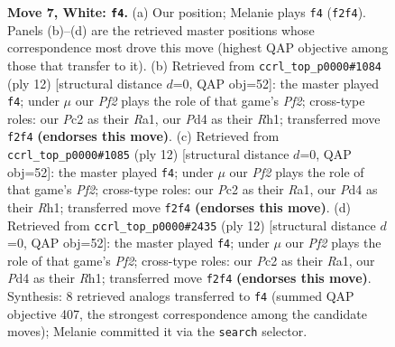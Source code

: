 \documentclass[11pt]{article}
\begin{document}
\begin{figure}[p]
\caption{\textbf{Move 7, White: \texttt{f4}.} (a) Our position; Melanie plays \texttt{f4} (\texttt{f2f4}). Panels (b)--(d) are the retrieved master positions whose correspondence most drove this move (highest QAP objective among those that transfer to it). (b) Retrieved from \texttt{ccrl\_top\_p0000\#1084} (ply 12) [structural distance $d$=0, QAP obj=52]: the master played \texttt{f4}; under $\mu$ our \emph{Pf2} plays the role of that game's \emph{Pf2}; cross-type roles: our \emph{P}c2 as their \emph{R}a1, our \emph{P}d4 as their \emph{R}h1; transferred move \texttt{f2f4} \textbf{(endorses this move)}. (c) Retrieved from \texttt{ccrl\_top\_p0000\#1085} (ply 12) [structural distance $d$=0, QAP obj=52]: the master played \texttt{f4}; under $\mu$ our \emph{Pf2} plays the role of that game's \emph{Pf2}; cross-type roles: our \emph{P}c2 as their \emph{R}a1, our \emph{P}d4 as their \emph{R}h1; transferred move \texttt{f2f4} \textbf{(endorses this move)}. (d) Retrieved from \texttt{ccrl\_top\_p0000\#2435} (ply 12) [structural distance $d$=0, QAP obj=52]: the master played \texttt{f4}; under $\mu$ our \emph{Pf2} plays the role of that game's \emph{Pf2}; cross-type roles: our \emph{P}c2 as their \emph{R}a1, our \emph{P}d4 as their \emph{R}h1; transferred move \texttt{f2f4} \textbf{(endorses this move)}. Synthesis: 8 retrieved analogs transferred to \texttt{f4} (summed QAP objective 407, the strongest correspondence among the candidate moves); Melanie committed it via the \texttt{search} selector.}
\label{fig:thought-m12}
\end{figure}

\clearpage
\end{document}
